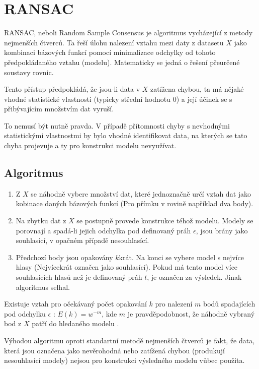 	

\section{RANSAC}
\label{chap_RANSAC} 

	RANSAC, neboli Random Sample Consensus \cite{imageproc_textbook} je algoritmus vycházející z metody nejmenších čtverců. Ta řeší úlohu nalezení vztahu mezi daty z datasetu $X$ jako kombinaci bázových funkcí pomocí minimalizace odchylky od tohoto předpokládaného vztahu (modelu). Matematicky se jedná o řešení přeurčené soustavy rovnic.
	
	Tento přístup předpokládá, že jsou-li data v $X$ zatížena chybou, ta má nějaké vhodné statistické vlastnosti (typicky střední hodnotu 0) a její účinek se s přibývajícím množstvím dat vyruší.
	
	To nemusí být nutně pravda. V případě přítomnosti chyby s nevhodnými statistickými vlastnostmi by bylo vhodné identifikovat data, na kterých se tato chyba projevuje a ty pro konstrukci modelu nevyužívat.
	
	\subsection{Algoritmus}
		
	\begin{enumerate}
		\item Z $X$  se náhodně vybere množství dat, které jednoznačně určí vztah dat jako kobinace daných bázových funkcí (Pro přímku v rovině například dva body).
		\item Na zbytku dat z $X$ se postupně provede konstrukce téhož modelu. Modely se porovnají a spadá-li jejich odchylka pod definovaný práh $\epsilon$, jsou brány jako souhlasící, v opačném případě nesouhlasící.
		\item Předchozí body jsou opakovány $k$krát. Na konci se vybere model s nejvíce hlasy (Nejvícekrát označen jako souhlasící). Pokud má tento model více souhlasících hlasů než je definovaný práh $t$, je označen za výsledek. Jinak algoritmus selhal.
	\end{enumerate}
	
		Existuje vztah pro očekávaný počet opakování $k$ pro nalezení $m$ bodů spadajících pod odchylku $\epsilon$ :
		$E(k) = w^{-m}$, kde $m$ je pravděpodobnost, že náhodně vybraný bod z $X$ patří do hledaného modelu \cite{fischler1981random} .
	
		Výhodou algoritmu oproti standartní metodě nejmenších čtverců je fakt, že data, která jsou označena jako nevěrohodná nebo zatížená chybou (produkují nesouhlasící modely) nejsou pro konstrukci výsledného modelu vůbec použita.
		
